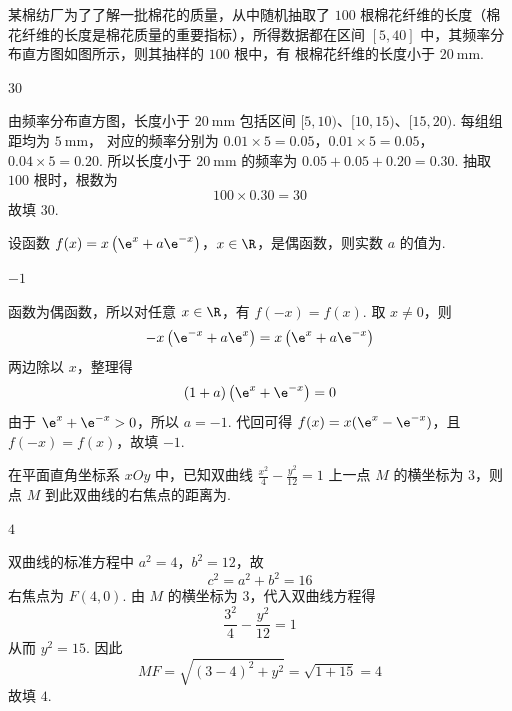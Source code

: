 \begin{problem}
某棉纺厂为了了解一批棉花的质量，从中随机抽取了 \(100\) 根棉花纤维的长度（棉花纤维的长度是棉花质量的重要指标），所得数据都在区间 \([5,40]\) 中，其频率分布直方图如图所示，则其抽样的 \(100\) 根中，有\fillinblank{} 根棉花纤维的长度小于 \(20 \mathrm{~mm}\).

\end{problem}

\begin{answer}
\(30\)
\end{answer}

\begin{solution}
由频率分布直方图，长度小于 \(20\mathrm{~mm}\) 包括区间 \([5,10)\)、\([10,15)\)、\([15,20)\). 每组组距均为 \(5\mathrm{~mm}\)，
对应的频率分别为 \(0.01\times5=0.05\)，\(0.01\times5=0.05\)，\(0.04\times5=0.20\).
所以长度小于 \(20\mathrm{~mm}\) 的频率为 \(0.05+0.05+0.20=0.30\). 抽取 \(100\) 根时，根数为
\[
100\times0.30=30
\]
故填 \(30\).
\end{solution}

\begin{problem}
设函数 \(f(x)=x\left(\e^x+a\e^{-x}\right)\)，\(x\in\R\)，是偶函数，则实数 \(a\) 的值为\fillinblank{}.
\end{problem}

\begin{answer}
\(-1\)
\end{answer}

\begin{solution}
函数为偶函数，所以对任意 \(x\in\R\)，有 \(f(-x)=f(x)\). 取 \(x\neq0\)，则
\[
-x\left(\e^{-x}+a\e^x\right)=x\left(\e^x+a\e^{-x}\right)
\]
两边除以 \(x\)，整理得
\[
(1+a)\left(\e^x+\e^{-x}\right)=0
\]
由于 \(\e^x+\e^{-x}>0\)，所以 \(a=-1\). 代回可得 \(f(x)=x(\e^x-\e^{-x})\)，且 \(f(-x)=f(x)\)，故填 \(-1\).
\end{solution}

\begin{problem}
在平面直角坐标系 \(xOy\) 中，已知双曲线 \(\frac{x^2}{4}-\frac{y^2}{12}=1\) 上一点 \(M\) 的横坐标为 \(3\)，则点 \(M\) 到此双曲线的右焦点的距离为\fillinblank{}.
\end{problem}

\begin{answer}
\(4\)
\end{answer}

\begin{solution}
双曲线的标准方程中 \(a^2=4\)，\(b^2=12\)，故
\[
c^2=a^2+b^2=16
\]
右焦点为 \(F(4,0)\). 由 \(M\) 的横坐标为 \(3\)，代入双曲线方程得
\[
\frac{3^2}{4}-\frac{y^2}{12}=1
\]
从而 \(y^2=15\).
因此
\[
MF=\sqrt{(3-4)^2+y^2}=\sqrt{1+15}=4
\]
故填 \(4\).
\end{solution}

